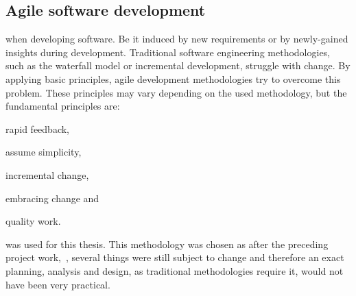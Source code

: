 \subsection{Agile software development}

 when developing software. Be
it induced by new requirements or by newly-gained insights during development.
Traditional software engineering methodologies, such as the waterfall model or
incremental development, struggle with change. By applying basic principles,
agile development methodologies try to overcome this problem. These principles
may vary depending on the used methodology, but the fundamental principles are:
\begin{enumerate*}
  \item rapid feedback,
  \item assume simplicity,
  \item incremental change,
  \item embracing change and
  \item quality work.
\end{enumerate*}%

 was used for this thesis.
This methodology was chosen as after the preceding project
work,~, several things were still subject to
change and therefore an exact planning, analysis and design, as traditional
methodologies require it, would not have been very practical.